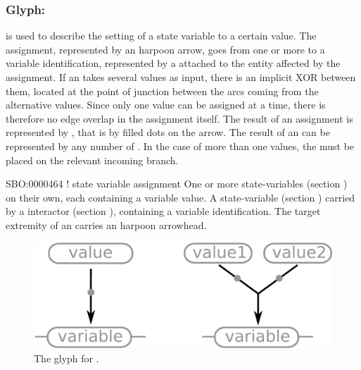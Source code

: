 
\subsubsection{Glyph: }\label{sec:assignment}

 is used to describe the setting of a state variable to a certain value. The assignment, represented by an harpoon arrow, goes from one or more  to a variable identification, represented by a  attached to the entity affected by the assignment. If an  takes several  values as input, there is an implicit XOR between them, located at the point of junction between the arcs coming from the alternative values. Since only one value can be assigned at a time, there is therefore no edge overlap in the assignment itself. The result of an assignment is represented by , that is by filled dots on the arrow. The result of an  can be represented by any number of . In the case of more than one  values, the  must be placed on the relevant incoming branch.

\begin{glyphDescription}
 \glyphSboTerm SBO:0000464 ! state variable assignment
 \glyphOrigin One or more state-variables (section ) on their own, each containing a variable value.
 \glyphTarget A state-variable (section ) carried by a interactor (section ), containing a variable identification.
 \glyphEndPoint The target extremity of an  carries an harpoon arrowhead.
 \end{glyphDescription}

\begin{figure}[H]
  \centering
  \includegraphics[scale = 0.3]{images/assignment}
  \caption{The \ER glyph for .}
  \label{fig:assignment}
\end{figure}

